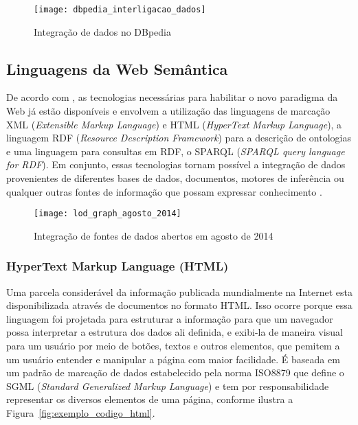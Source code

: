 \begin{figure}[!phtb]
  \centering
  \texttt{[image: dbpedia\_interligacao\_dados]} 
  \caption{Integração de dados no DBpedia \citep{Auer2007}}
  \label{fig:dbpedia_interligacao_dados} 
\end{figure}

\subsection{Linguagens da Web Semântica}
\label{sec:linguagens_Web_semantica}

De acordo com \citet{Allemang2011}, as tecnologias necessárias para habilitar o novo paradigma da Web já estão disponíveis e envolvem a utilização das linguagens de marcação XML (\emph{Extensible Markup Language}) e HTML (\emph{HyperText Markup Language}), a linguagem RDF (\emph{Resource Description Framework}) para a descrição de ontologias e uma linguagem para consultas em RDF, o SPARQL (\emph{SPARQL query language for RDF}). Em conjunto, essas tecnologias tornam possível a integração de dados provenientes de diferentes bases de dados, documentos, motores de inferência ou qualquer outras fontes de informação que possam expressar conhecimento \citep{Wang}.

\begin{figure}[p]
  \centering
  \texttt{[image: lod\_graph\_agosto\_2014]} 
  \caption{Integração de fontes de dados abertos em agosto de 2014 \citep{Cyganiak2014}}
  \label{fig:lod_graph_agosto_2014} 
\end{figure}

\subsubsection{HyperText Markup Language (HTML)}
\label{sec:html}

Uma parcela considerável da informação publicada mundialmente na Internet esta disponibilizada através de documentos no formato HTML. Isso ocorre porque essa linguagem foi projetada para estruturar a informação para que um navegador possa interpretar a estrutura dos dados ali definida, e exibi-la de maneira visual para um usuário por meio de botões, textos e outros elementos, que pemitem a um usuário entender e manipular a página com maior facilidade. É baseada em um padrão de marcação de dados estabelecido pela norma ISO8879 que define o SGML (\emph{Standard Generalized Markup Language}) e tem por responsabilidade representar os diversos elementos de uma página, conforme ilustra a Figura~\ref{fig:exemplo_codigo_html}.

